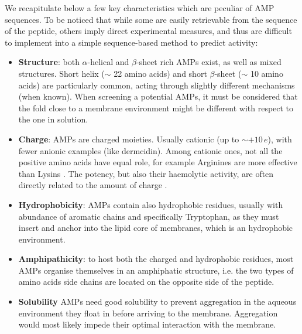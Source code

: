 We recapitulate below a few key characteristics which are peculiar of AMP sequences. To be noticed that while some are easily retrievable from the sequence of the peptide, others imply direct experimental measures, and thus are difficult to implement into a simple sequence-based method to predict activity:
\begin{itemize}
\item \textbf{Structure}: both $\alpha$-helical and $\beta$-sheet rich AMPs exist, as well as mixed structures. Short helix ($\sim$ 22 amino acids) and short $\beta$-sheet ($\sim$ 10 amino acids) are particularly common, acting through slightly different mechanisms (when known). When screening a potential AMPs, it must be considered that the fold close to a membrane environment might be different with respect to the one in solution.
%
\item \textbf{Charge}: AMPs are charged moieties. Usually cationic (up to $\sim + 10\,e$), with fewer anionic examples (like dermcidin). Among cationic ones, not all the positive amino acids have equal role, for example Arginines are more effective than Lysins \cite{Chan2006}. The potency, but also their haemolytic activity, are often directly related to the amount of charge \cite{???}.
%
\item \textbf{Hydrophobicity}: AMPs contain also hydrophobic residues, usually with abundance of aromatic chains and specifically Tryptophan, as they must insert and anchor into the lipid core of membranes, which is an hydrophobic environment.
%
\item \textbf{Amphipathicity}: to host both the charged and hydrophobic residues, most AMPs organise themselves in an amphiphatic structure, i.e. the two types of amino acids side chains are located on the opposite side of the peptide.
%
\item \textbf{Solubility} AMPs need good solubility to prevent aggregation in the aqueous environment they float in before arriving to the membrane. Aggregation would most likely impede their optimal interaction with the membrane.
\end{itemize}

